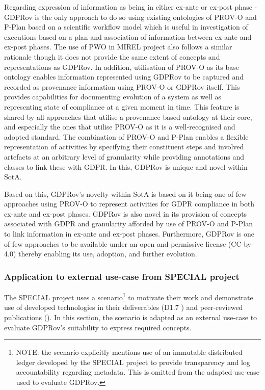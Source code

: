 Regarding expression of information as being in either ex-ante or ex-post phase - GDPRov is the only approach to do so using existing ontologies of PROV-O and P-Plan based on a scientific workflow model which is useful in investigation of executions based on a plan and association of information between ex-ante and ex-post phases. The use of PWO \cite{gangemi_publishing_2017} in MIREL project also follows a similar rationale though it does not provide the same extent of concepts and representations as GDPRov.
In addition, utilisation of PROV-O as its base ontology enables information represented using GDPRov to be captured and recorded as provenance information using PROV-O or GDPRov itself. This provides capabilities for documenting evolution of a system as well as representing state of compliance at a given moment in time.
This feature is shared by all approaches that utilise a provenance based ontology at their core, and especially the ones that utilise PROV-O as it is a well-recognised and adopted standard.
The combination of PROV-O and P-Plan enables a flexible representation of activities by specifying their constituent steps and involved artefacts at an arbitrary level of granularity while providing annotations and classes to link these with GDPR. In this, GDPRov is unique and novel within SotA.

Based on this, GDPRov's novelty within SotA is based on it being one of few approaches using PROV-O to represent activities for GDPR compliance in both ex-ante and ex-post phases. GDPRov is also novel in its provision of concepts associated with GDPR and granularity afforded by use of PROV-O and P-Plan to link information in ex-ante and ex-post phases.
Furthermore, GDPRov is one of few approaches to be available under an open and permissive license (CC-by-4.0) thereby enabling its use, adoption, and further evolution.

\subsubsection{Application to external use-case from SPECIAL project}\label{sec:gdprov:use-case:SPECIAL}
The SPECIAL project uses a scenario\footnote{NOTE: the scenario explicitly mentions use of an immutable distributed ledger developed by the SPECIAL project to provide transparency and log accountability regarding metadata. This is omitted from the adapted use-case used to evaluate GDPRov.} to motivate their work and demonstrate use of developed technologies in their deliverables (D1.7 \cite{bonatti_d1.7_2018}) and peer-reviewed publications (\cite{kirrane_scalable_2018}).
In this section, the scenario is adapted as an external use-case to evaluate GDPRov's suitability to express required concepts.

